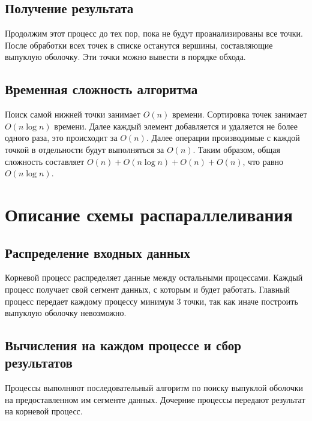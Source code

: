 \documentclass[a4paper,12pt]{article}
\begin{document}
\subsection*{Получение результата}

\hspace*{15pt}Продолжим этот процесс до тех пор, пока не будут проанализированы все точки. После обработки всех точек в списке останутся вершины, составляющие выпуклую оболочку. Эти точки можно вывести в порядке обхода.


\subsection*{Временная сложность алгоритма}

\hspace*{15pt}Поиск самой нижней точки занимает \( O(n) \) времени. Сортировка точек занимает \( O(n \log n) \) времени. Далее каждый элемент добавляется и удаляется не более одного раза, это происходит за \( O(n) \). Далее операции производимые с каждой точкой в отдельности будут выполняться за \( O(n) \). Таким образом, общая сложность составляет \( O(n) + O(n \log n) + O(n) + O(n) \), что равно \( O(n \log n) \).

\section{Описание схемы распараллеливания}

\subsection*{Распределение входных данных}

\hspace*{15pt}Корневой процесс распределяет данные между остальными процессами. Каждый процесс получает свой сегмент данных, с которым и будет работать. Главный процесс передает каждому процессу минимум 3 точки, так как иначе построить выпуклую оболочку невозможно.

\subsection*{Вычисления на каждом процессе и сбор результатов}
\hspace*{15pt}Процессы выполняют последовательный алгоритм по поиску выпуклой оболочки на предоставленном им сегменте данных. Дочерние процессы передают результат на корневой процесс.
\end{document}

